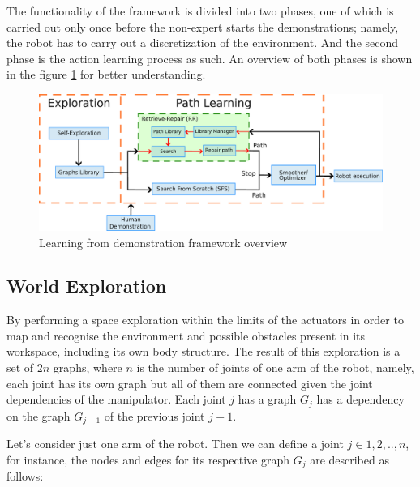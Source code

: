 \documentclass[thesis]{mas_proposal}
\begin{document}
    The functionality of the framework is divided into two phases, one of which is carried out only once before the non-expert starts the demonstrations; namely, the robot has to carry out a discretization of the environment. And the second phase is the action learning process as such. An overview of both phases is shown in the figure \ref{fig:framework_overview} for better understanding.
    
    
    \begin{figure}[h!]
    	\includegraphics[width=\textwidth]{images/framework_overview.pdf}
    	\caption{Learning from demonstration framework overview}
    	\label{fig:framework_overview}
    \end{figure}
    

\subsection{World Exploration}
    
    By performing a space exploration within the limits of the actuators in order to map and recognise the environment and possible obstacles present in its workspace, including its own body structure. The result of this exploration is a set of $2n$ graphs, where $n$ is the number of joints of one arm of the robot, namely, each joint has its own graph but all of them are connected given the joint dependencies of the manipulator. Each joint $j$ has a graph $G_j$ has a dependency on the graph $G_{j-1}$ of the previous joint $j-1$. 
    
    Let's consider just one arm of the robot. Then we can define a joint $j \in {1,2,..,n}$, for instance, the nodes and edges for its respective graph $G_j$ are described as follows:
    
\end{document}
